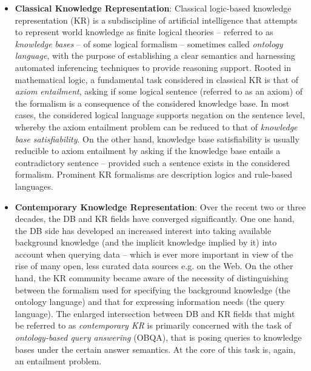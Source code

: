 \begin{itemize}
Another way in which entailment arises in the area of databases is in static analysis of queries and views. The popular problem of query containment asks if every answer for $Q_1$ is an answer for $Q_2$ over every database.    
\item \textbf{Classical Knowledge Representation}: Classical logic-based knowledge representation (KR) is a subdiscipline of artificial intelligence that attempts to represent world knowledge as finite logical theories  -- referred to as \emph{knowledge bases} -- of some logical formalism -- sometimes called \emph{ontology language}, with the purpose of establishing a clear semantics and harnessing automated inferencing techniques to provide reasoning support. Rooted in mathematical logic, a fundamental task considered in classical KR is that of \emph{axiom entailment}, asking if some logical sentence (referred to as an axiom) of the formalism is a consequence of the considered knowledge base. In most cases, the considered logical language supports negation on the sentence level, whereby the axiom entailment problem can be reduced to that of \emph{knowledge base satisfiability}. On the other hand, knowledge base satisfiability is usually reducible to axiom entailment by asking if the knowledge base entails a contradictory sentence -- provided such a sentence exists in the considered formalism. Prominent KR formalisms are description logics and rule-based languages.     
\item \textbf{Contemporary Knowledge Representation}: Over the recent two or three decades, the DB and KR fields have converged significantly. One one hand, the DB side has developed an increased interest into taking available background knowledge (and the implicit knowledge implied by it) into account when querying data -- which is ever more important in view of the rise of many open, less curated data sources e.g. on the Web. On the other hand, the KR community became aware of the necessity of distinguishing between the formalism used for specifying the background knowledge (the ontology language) and that for expressing information needs (the query language). The enlarged intersection between DB and KR fields that might be referred to as \emph{contemporary KR} is primarily concerned with the task of \emph{ontology-based query answering} (OBQA), that is posing queries to knowledge bases under the certain answer semantics. At the core of this task is, again, an entailment problem. 
\end{itemize}


\medskip

